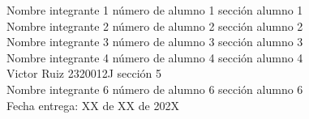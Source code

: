 \documentclass[letterpaper]{article}
\begin{document}
\vspace*{30mm}
\flushright 
	
Nombre integrante 1	número de alumno 1 sección alumno 1 \\
Nombre integrante 2	número de alumno 2 sección alumno 2\\
Nombre integrante 3	número de alumno 3 sección alumno 3\\
Nombre integrante 4	número de alumno 4 sección alumno 4\\
Victor Ruiz	2320012J sección 5\\
Nombre integrante 6 número de alumno 6 sección alumno 6\\

 
\vspace*{5mm}
{\large Fecha entrega: XX de XX de 202X\\}

\newpage
\begin{flushleft}
\tableofcontents
\end{flushleft}
\end{document}
